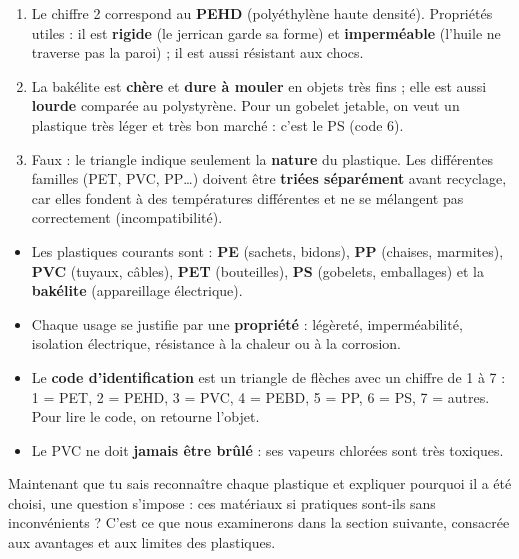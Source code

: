 \documentclass[11pt]{article}
\begin{document}
\begin{corrige}
\begin{enumerate}
\item Le chiffre 2 correspond au \textbf{PEHD} (polyéthylène haute densité). Propriétés utiles : il est \textbf{rigide} (le jerrican garde sa forme) et \textbf{imperméable} (l'huile ne traverse pas la paroi) ; il est aussi résistant aux chocs.
\item La bakélite est \textbf{chère} et \textbf{dure à mouler} en objets très fins ; elle est aussi \textbf{lourde} comparée au polystyrène. Pour un gobelet jetable, on veut un plastique très léger et très bon marché : c'est le PS (code 6).
\item Faux : le triangle indique seulement la \textbf{nature} du plastique. Les différentes familles (PET, PVC, PP\ldots) doivent être \textbf{triées séparément} avant recyclage, car elles fondent à des températures différentes et ne se mélangent pas correctement (incompatibilité).
\end{enumerate}
\end{corrige}

\begin{aretenir}
\begin{itemize}
\item Les plastiques courants sont : \textbf{PE} (sachets, bidons), \textbf{PP} (chaises, marmites), \textbf{PVC} (tuyaux, câbles), \textbf{PET} (bouteilles), \textbf{PS} (gobelets, emballages) et la \textbf{bakélite} (appareillage électrique).
\item Chaque usage se justifie par une \textbf{propriété} : légèreté, imperméabilité, isolation électrique, résistance à la chaleur ou à la corrosion.
\item Le \textbf{code d'identification} est un triangle de flèches avec un chiffre de 1 à 7 : 1 = PET, 2 = PEHD, 3 = PVC, 4 = PEBD, 5 = PP, 6 = PS, 7 = autres. Pour lire le code, on retourne l'objet.
\item Le PVC ne doit \textbf{jamais être brûlé} : ses vapeurs chlorées sont très toxiques.
\end{itemize}
\end{aretenir}

Maintenant que tu sais reconnaître chaque plastique et expliquer pourquoi il a été choisi, une question s'impose : ces matériaux si pratiques sont-ils sans inconvénients ? C'est ce que nous examinerons dans la section suivante, consacrée aux avantages et aux limites des plastiques.
\end{document}
